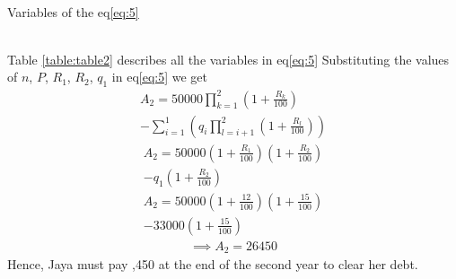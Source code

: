 \documentclass[journal,12pt,two column]{IEEEtran}
\begin{document}
\begin{enumerate}
\begin{multline}
\end{multline}
\begin{table}[h!]
   \caption{Variables of the eq\eqref{eq:5}}
   \label{table:table2}
    \centering
   
\end{table}\\
Table \ref{table:table2} describes all the variables in eq\eqref{eq:5}
Substituting the values of
$n$, $P$, $R_1$, $R_2$, $q_1$ in eq\eqref{eq:5} we get
 \begin{multline}
    A_2 = 50000 \prod_{k = 1}^{2}  {\left(  1+\frac{R_k}{100}     \right)} \\ - \sum_{i=1}^{1}{\left(q_i\prod_{l=i+1}^{2}{\left(1+\frac{R_l}{100}\right)}\right)}
\end{multline}
\begin{multline}
    A_2 =50000\left(1+\frac{R_1}{100}\right)\left(1+\frac{R_2}{100}\right)\\ - q_1\left(1+\frac{R_2}{100}\right)
\end{multline}
\begin{multline}
       A_2  =50000\left(1+\frac{12}{100}\right)\left(1+\frac{15}{100}\right) \\ - 33000\left(1+\frac{15}{100}\right)
\end{multline}
\begin{align}
   \implies A_2 = 26450
\end{align}
Hence, Jaya must pay ,450 at the end of the second year to clear her debt.
\end{enumerate}
\end{document}
